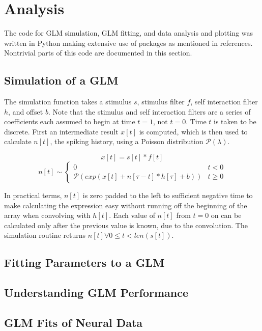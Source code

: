 \documentclass[letterpaper,titlepage,10pt]{article}
\begin{document}
\section{Analysis}

The code for GLM simulation, GLM fitting, and data analysis and plotting was written in Python making extensive use
of packages as mentioned in references. Nontrivial parts of this code are documented in this section.

\subsection{Simulation of a GLM}

The simulation function takes a stimulus $s$, stimulus filter $f$, self interaction filter $h$, and offset $b$. Note
that the stimulus and self interaction filters are a series of coefficients each assumed to begin at time $t=1$, not
$t=0$. Time $t$ is taken to be discrete. First an intermediate result $x[t]$ is computed, which is then used to
calculate $n[t]$, the spiking history, using a Poisson distribution $\mathcal{P}(\lambda)$.

$$x[t]=s[t]*f[t]$$
$$n[t]\sim
\begin{cases}
0 & t < 0\\
\mathcal{P}(exp(x[t]+n[\tau-t]*h[\tau]+b)) & t \geq 0
\end{cases}$$

In practical terms, $n[t]$ is zero padded to the left to sufficient negative time to make calculating the expression
easy without running off the beginning of the array when convolving with $h[t]$. Each value of $n[t]$ from $t=0$ on
can be calculated only after the previous value is known, due to the convolution. The simulation routine returns
$n[t] \forall 0 \leq t < len(s[t])$.

\subsection{Fitting Parameters to a GLM}

\subsection{Understanding GLM Performance}

\subsection{GLM Fits of Neural Data}
\end{document}
